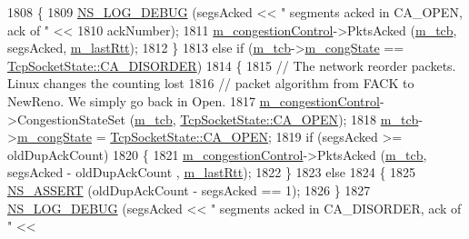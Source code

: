\begin{DoxyCode}
1808             \{
1809               \hyperlink{group__logging_ga413f1886406d49f59a6a0a89b77b4d0a}{NS\_LOG\_DEBUG} (segsAcked << \textcolor{stringliteral}{" segments acked in CA\_OPEN, ack of "} <<
1810                             ackNumber);
1811               \hyperlink{classns3_1_1TcpSocketBase_a090719d52b06a791341e2fefa5e12c3e}{m\_congestionControl}->PktsAcked (\hyperlink{classns3_1_1TcpSocketBase_a26bbaf59001308dc43fb630d76f2e38b}{m\_tcb}, segsAcked, 
      \hyperlink{classns3_1_1TcpSocketBase_a6c48fbea019c593b975bd1d5f5c95dde}{m\_lastRtt});
1812             \}
1813           \textcolor{keywordflow}{else} \textcolor{keywordflow}{if} (\hyperlink{classns3_1_1TcpSocketBase_a26bbaf59001308dc43fb630d76f2e38b}{m\_tcb}->\hyperlink{classns3_1_1TcpSocketState_a4053e1eb120c572d0881b04620b52c30}{m\_congState} == 
      \hyperlink{classns3_1_1TcpSocketState_a6fc313945a33d48fd60cbffe0c787b19a389f9d267c6b0a752d39a0d1a9ee3aae}{TcpSocketState::CA\_DISORDER})
1814             \{
1815               \textcolor{comment}{// The network reorder packets. Linux changes the counting lost}
1816               \textcolor{comment}{// packet algorithm from FACK to NewReno. We simply go back in Open.}
1817               \hyperlink{classns3_1_1TcpSocketBase_a090719d52b06a791341e2fefa5e12c3e}{m\_congestionControl}->CongestionStateSet (\hyperlink{classns3_1_1TcpSocketBase_a26bbaf59001308dc43fb630d76f2e38b}{m\_tcb}, 
      \hyperlink{classns3_1_1TcpSocketState_a6fc313945a33d48fd60cbffe0c787b19af2d22f02a77b603394c34d4968bad142}{TcpSocketState::CA\_OPEN});
1818               \hyperlink{classns3_1_1TcpSocketBase_a26bbaf59001308dc43fb630d76f2e38b}{m\_tcb}->\hyperlink{classns3_1_1TcpSocketState_a4053e1eb120c572d0881b04620b52c30}{m\_congState} = \hyperlink{classns3_1_1TcpSocketState_a6fc313945a33d48fd60cbffe0c787b19af2d22f02a77b603394c34d4968bad142}{TcpSocketState::CA\_OPEN};
1819               \textcolor{keywordflow}{if} (segsAcked >= oldDupAckCount)
1820                 \{
1821                   \hyperlink{classns3_1_1TcpSocketBase_a090719d52b06a791341e2fefa5e12c3e}{m\_congestionControl}->PktsAcked (\hyperlink{classns3_1_1TcpSocketBase_a26bbaf59001308dc43fb630d76f2e38b}{m\_tcb}, segsAcked - oldDupAckCount
      , \hyperlink{classns3_1_1TcpSocketBase_a6c48fbea019c593b975bd1d5f5c95dde}{m\_lastRtt});
1822                 \}
1823               \textcolor{keywordflow}{else}
1824                 \{
1825                   \hyperlink{assert_8h_a6dccdb0de9b252f60088ce281c49d052}{NS\_ASSERT} (oldDupAckCount - segsAcked == 1);
1826                 \}
1827               \hyperlink{group__logging_ga413f1886406d49f59a6a0a89b77b4d0a}{NS\_LOG\_DEBUG} (segsAcked << \textcolor{stringliteral}{" segments acked in CA\_DISORDER, ack of "} <<

\end{DoxyCode}

